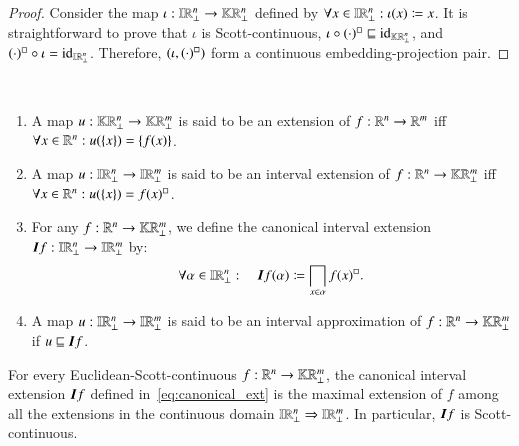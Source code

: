 \documentclass[11pt,times]{article}
\begin{document}
  \begin{proof}
    Consider the map
    $\iota : \intvaldom[\R^n\lift] \to \kCPPO{\R^n\lift}$ defined by
    $\forall x \in \intvaldom[\R^n\lift]: \iota( x) \defeq x$. It is
    straightforward to prove that $\iota$ is Scott-continuous,
    $\iota \circ \hbClos{(\cdot)} \sqsubseteq
    \id_{\kCPPO{\R^n\lift}}$, and
    $\hbClos{(\cdot)} \circ \iota =
    \id_{\intvaldom[\R^n\lift]}$. Therefore,
    $(\iota, \hbClos{(\cdot)})$ form a continuous embedding-projection
    pair.
  \end{proof}


  
\begin{definition}{\ }
  \label{def:ext_canonical_ext}

  \begin{enumerate}[label=(\roman*)]

  \item \label{item:extension} A map
    $u: \kCPPO{\R^n\lift} \to \kCPPO{\R^m\lift}$ is said to be an
    extension of $f: \R^n \to \R^m$ iff
    $\forall x \in \R^n: u(\set{x}) = \set{f(x)}$.

    
  \item A map $u: \intvaldom[\R^n\lift] \to \intvaldom[\R^m\lift]$ is
    said to be an interval extension of
    $f: \R^n \to \kCPPO{\R^m\lift}$ iff
    $\forall x \in \R^n: u(\set{x}) = \hbClos{f(x)}$.


  \item \label{item:canonical_interval_extension} For any
    $f : \R^n \to \kCPPO{\R^m\lift}$, we define the canonical interval
    extension
    ${\intvalfun[f]} : \intvaldom[\R^n\lift] \to
    \intvaldom[\R^m\lift]$ by:
    \begin{equation}
      \label{eq:canonical_ext}
      \forall \alpha \in \intvaldom[\R^n\lift]: \quad
      {\intvalfun[f]}(\alpha) 
      \defeq \bigsqcap_{x \in \alpha} \hbClos{f(x)}.
    \end{equation}
  

  \item A map $u: \intvaldom[\R^n\lift] \to \intvaldom[\R^m\lift]$ is
    said to be an interval approximation of
    $f: \R^n \to \kCPPO{\R^m\lift}$ if $u \sqsubseteq \intvalfun[f]$.   
  \end{enumerate}
\end{definition}
%

  

\begin{proposition}
\label{prop:canonical_interval_extension}
  For every Euclidean-Scott-continuous
  $f : \R^n \to \kCPPO{\R^m\lift}$, the canonical interval extension
  ${\intvalfun[f]}$ defined in~\eqref{eq:canonical_ext} is the maximal
  extension of $f$ among all the extensions in the continuous domain
  $\intvaldom[\R^n\lift] \Rightarrow \intvaldom[\R^m\lift]$. In
  particular, ${\intvalfun[f]}$ is Scott-continuous.
\end{proposition}
\end{document}
